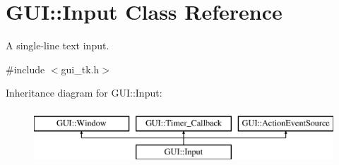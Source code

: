 \hypertarget{classGUI_1_1Input}{\section{G\-U\-I\-:\-:Input Class Reference}
\label{classGUI_1_1Input}
}


A single-\/line text input.  




{\ttfamily \#include $<$gui\-\_\-tk.\-h$>$}

Inheritance diagram for G\-U\-I\-:\-:Input\-:\begin{figure}[H]
\begin{center}
\leavevmode
\includegraphics[height=2.000000cm]{classGUI_1_1Input}
\end{center}
\end{figure}
